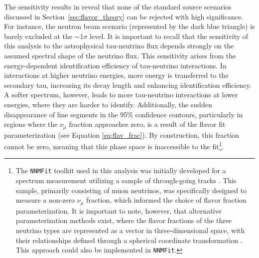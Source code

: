The sensitivity results in  reveal that none of the standard source scenarios discussed in Section~\ref{sec:flavor_theory} can be rejected with high significance. For instance, the neutron beam scenario (represented by the dark blue triangle) is barely excluded at the $\sim1\sigma$ level. It is important to recall that the sensitivity of this analysis to the astrophysical tau-neutrino flux depends strongly on the assumed spectral shape of the neutrino flux. This sensitivity arises from the energy-dependent identification efficiency of tau-neutrino interactions. In interactions at higher neutrino energies, more energy is transferred to the secondary tau, increasing its decay length and enhancing identification efficiency. A softer spectrum, however, leads to more tau-neutrino interactions at lower energies, where they are harder to identify. Additionally, the sudden disappearance of line segments in the 95\% confidence contours, particularly in regions where the $\nu_\mu$ fraction approaches zero, is a result of the flavor fit parameterization (see Equation \ref{eq:flav_frac}). By construction, this fraction cannot be zero, meaning that this phase space is inaccessible to the fit\footnote{The \texttt{NNMFit} toolkit used in this analysis was initially developed for a spectrum measurement utilizing a sample of through-going tracks \cite{diffusenumu}. This sample, primarily consisting of muon neutrinos, was specifically designed to measure a non-zero \(\nu_{\mu}\) fraction, which informed the choice of flavor fraction parameterization. It is important to note, however, that alternative parameterization methods exist, where the flavor fractions of the three neutrino types are represented as a vector in three-dimensional space, with their relationships defined through a spherical coordinate transformation \cite{golemflavor}. This approach could also be implemented in \texttt{NNMFit}.}.

